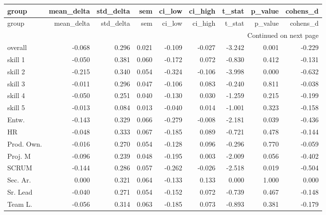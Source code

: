 \begin{longtable}{lrrrrrrrr}
\toprule
group & mean\_delta & std\_delta & sem & ci\_low & ci\_high & t\_stat & p\_value & cohens\_d \\
\midrule
\endfirsthead
\toprule
group & mean\_delta & std\_delta & sem & ci\_low & ci\_high & t\_stat & p\_value & cohens\_d \\
\midrule
\endhead
\midrule
\multicolumn{9}{r}{Continued on next page} \\
\midrule
\endfoot
\bottomrule
\endlastfoot
overall & -0.068 & 0.296 & 0.021 & -0.109 & -0.027 & -3.242 & 0.001 & -0.229 \\
skill 1 & -0.050 & 0.381 & 0.060 & -0.172 & 0.072 & -0.830 & 0.412 & -0.131 \\
skill 2 & -0.215 & 0.340 & 0.054 & -0.324 & -0.106 & -3.998 & 0.000 & -0.632 \\
skill 3 & -0.011 & 0.296 & 0.047 & -0.106 & 0.083 & -0.240 & 0.811 & -0.038 \\
skill 4 & -0.050 & 0.251 & 0.040 & -0.130 & 0.030 & -1.259 & 0.215 & -0.199 \\
skill 5 & -0.013 & 0.084 & 0.013 & -0.040 & 0.014 & -1.001 & 0.323 & -0.158 \\
Entw. & -0.143 & 0.329 & 0.066 & -0.279 & -0.008 & -2.181 & 0.039 & -0.436 \\
HR & -0.048 & 0.333 & 0.067 & -0.185 & 0.089 & -0.721 & 0.478 & -0.144 \\
Prod. Own. & -0.016 & 0.270 & 0.054 & -0.128 & 0.096 & -0.296 & 0.770 & -0.059 \\
Proj. M & -0.096 & 0.239 & 0.048 & -0.195 & 0.003 & -2.009 & 0.056 & -0.402 \\
SCRUM & -0.144 & 0.286 & 0.057 & -0.262 & -0.026 & -2.518 & 0.019 & -0.504 \\
Sec. Ar. & 0.000 & 0.321 & 0.064 & -0.133 & 0.133 & 0.000 & 1.000 & 0.000 \\
Sr. Lead & -0.040 & 0.271 & 0.054 & -0.152 & 0.072 & -0.739 & 0.467 & -0.148 \\
Team L. & -0.056 & 0.314 & 0.063 & -0.185 & 0.073 & -0.893 & 0.381 & -0.179 \\
\end{longtable}
